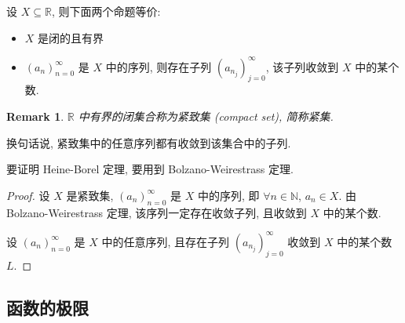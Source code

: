 \documentclass[UTF8]{ctexart}
\theoremstyle{mystyle}
\theoremstyle{myremark}
\newtheorem*{remark}{Remark}
\theoremstyle{plain}
\newcommand{\R}{\mathbb R}
\newcommand{\N}{\mathbb N}
\begin{document}
\begin{theorem}
    设 $ X \subseteq \R $, 则下面两个命题等价:
    \begin{itemize}
        \item $ X $ 是闭的且有界
        \item $ (a_n)_{n = 0}^\infty $ 是 $ X $ 中的序列, 则存在子列 $ (a_{n_j})_{j = 0}^\infty $, 该子列收敛到 $ X $ 中的某个数.
    \end{itemize}
\end{theorem}

\begin{remark}
    $ \R $ 中有界的闭集合称为紧致集 (compact set), 简称紧集.
\end{remark}

换句话说, 紧致集中的任意序列都有收敛到该集合中的子列.

要证明 Heine-Borel 定理, 要用到 Bolzano-Weirestrass 定理.

\begin{proof}
    设 $ X $ 是紧致集, $ (a_n)_{n = 0}^\infty $ 是 $ X $ 中的序列, 即 $ \forall n \in \N $, $ a_n \in X $. 由 Bolzano-Weirestrass 定理, 该序列一定存在收敛子列, 且收敛到 $ X $ 中的某个数.

    设 $ (a_n)_{n = 0}^\infty $ 是 $ X $ 中的任意序列, 且存在子列 $ (a_{n_j})_{j = 0}^\infty $ 收敛到 $ X $ 中的某个数 $ L $.
\end{proof}

\subsection{函数的极限}
\end{document}
